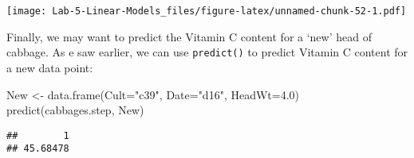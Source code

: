 \documentclass[
]{article}
\newenvironment{Shaded}{\begin{snugshade}}{\end{snugshade}}
\newcommand{\AttributeTok}[1]{\textcolor[rgb]{0.77,0.63,0.00}{#1}}
\newcommand{\FloatTok}[1]{\textcolor[rgb]{0.00,0.00,0.81}{#1}}
\newcommand{\FunctionTok}[1]{\textcolor[rgb]{0.00,0.00,0.00}{#1}}
\newcommand{\NormalTok}[1]{#1}
\newcommand{\OtherTok}[1]{\textcolor[rgb]{0.56,0.35,0.01}{#1}}
\newcommand{\StringTok}[1]{\textcolor[rgb]{0.31,0.60,0.02}{#1}}
\begin{document}
\texttt{[image: Lab-5-Linear-Models\_files/figure-latex/unnamed-chunk-52-1.pdf]}

Finally, we may want to predict the Vitamin C content for a `new' head
of cabbage. As e saw earlier, we can use \texttt{predict()} to predict
Vitamin C content for a new data point:

\begin{Shaded}
\begin{Highlighting}[]
\NormalTok{New }\OtherTok{\textless{}{-}} \FunctionTok{data.frame}\NormalTok{(}\AttributeTok{Cult=}\StringTok{"c39"}\NormalTok{, }\AttributeTok{Date=}\StringTok{"d16"}\NormalTok{, }\AttributeTok{HeadWt=}\FloatTok{4.0}\NormalTok{)}
\FunctionTok{predict}\NormalTok{(cabbages.step, New)}
\end{Highlighting}
\end{Shaded}

\begin{verbatim}
##        1 
## 45.68478
\end{verbatim}
\end{document}
